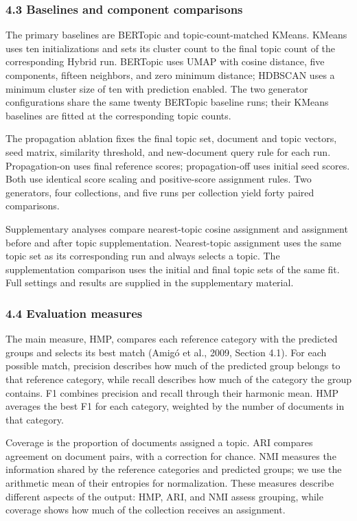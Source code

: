 \documentclass[
  11pt,
  a4paper,
]{article}
\begin{document}
\subsubsection{4.3 Baselines and component
comparisons}\label{baselines-and-component-comparisons}

The primary baselines are BERTopic and topic-count-matched KMeans.
KMeans uses ten initializations and sets its cluster count to the final
topic count of the corresponding Hybrid run. BERTopic uses UMAP with
cosine distance, five components, fifteen neighbors, and zero minimum
distance; HDBSCAN uses a minimum cluster size of ten with prediction
enabled. The two generator configurations share the same twenty BERTopic
baseline runs; their KMeans baselines are fitted at the corresponding
topic counts.

The propagation ablation fixes the final topic set, document and topic
vectors, seed matrix, similarity threshold, and new-document query rule
for each run. Propagation-on uses final reference scores;
propagation-off uses initial seed scores. Both use identical score
scaling and positive-score assignment rules. Two generators, four
collections, and five runs per collection yield forty paired
comparisons.

Supplementary analyses compare nearest-topic cosine assignment and
assignment before and after topic supplementation. Nearest-topic
assignment uses the same topic set as its corresponding run and always
selects a topic. The supplementation comparison uses the initial and
final topic sets of the same fit. Full settings and results are supplied
in the supplementary material.

\subsubsection{4.4 Evaluation measures}\label{evaluation-measures}

The main measure, HMP, compares each reference category with the
predicted groups and selects its best match (Amigó et al., 2009, Section
4.1). For each possible match, precision describes how much of the
predicted group belongs to that reference category, while recall
describes how much of the category the group contains. F1 combines
precision and recall through their harmonic mean. HMP averages the best
F1 for each category, weighted by the number of documents in that
category.

Coverage is the proportion of documents assigned a topic. ARI compares
agreement on document pairs, with a correction for chance. NMI measures
the information shared by the reference categories and predicted groups;
we use the arithmetic mean of their entropies for normalization. These
measures describe different aspects of the output: HMP, ARI, and NMI
assess grouping, while coverage shows how much of the collection
receives an assignment.
\end{document}
